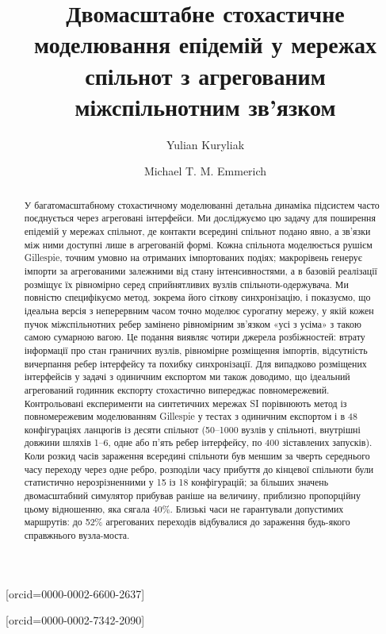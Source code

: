 
\title[mode=title]{Двомасштабне стохастичне моделювання епідемій у мережах спільнот з агрегованим міжспільнотним зв'язком}

\author[1]{Yulian Kuryliak}[orcid=0000-0002-6600-2637]
\cormark[1]

\author[2]{Michael T. M. Emmerich}[orcid=0000-0002-7342-2090]


\begin{abstract}
У багатомасштабному стохастичному моделюванні детальна динаміка підсистем часто поєднується через агреговані інтерфейси. Ми досліджуємо цю задачу для поширення епідемій у мережах спільнот, де контакти всередині спільнот подано явно, а зв'язки між ними доступні лише в агрегованій формі. Кожна спільнота моделюється рушієм Gillespie, точним умовно на отриманих імпортованих подіях; макрорівень генерує імпорти за агрегованими залежними від стану інтенсивностями, а в базовій реалізації розміщує їх рівномірно серед сприйнятливих вузлів спільноти-одержувача. Ми повністю специфікуємо метод, зокрема його сіткову синхронізацію, і показуємо, що ідеальна версія з неперервним часом точно моделює сурогатну мережу, у якій кожен пучок міжспільнотних ребер замінено рівномірним зв'язком «усі з усіма» з такою самою сумарною вагою. Це подання виявляє чотири джерела розбіжностей: втрату інформації про стан граничних вузлів, рівномірне розміщення імпортів, відсутність вичерпання ребер інтерфейсу та похибку синхронізації. Для випадково розміщених інтерфейсів у задачі з одиничним експортом ми також доводимо, що ідеальний агрегований годинник експорту стохастично випереджає повномережевий. Контрольовані експерименти на синтетичних мережах SI порівнюють метод із повномережевим моделюванням Gillespie у тестах з одиничним експортом і в 48 конфігураціях ланцюгів із десяти спільнот (50--1000 вузлів у спільноті, внутрішні довжини шляхів 1--6, одне або п'ять ребер інтерфейсу, по 400 зіставлених запусків). Коли розкид часів зараження всередині спільноти був меншим за чверть середнього часу переходу через одне ребро, розподіли часу прибуття до кінцевої спільноти були статистично нерозрізненними у 15 із 18 конфігурацій; за більших значень двомасштабний симулятор прибував раніше на величину, приблизно пропорційну цьому відношенню, яка сягала 40\%. Близькі часи не гарантували допустимих маршрутів: до 52\% агрегованих переходів відбувалися до зараження будь-якого справжнього вузла-моста.
\end{abstract}


